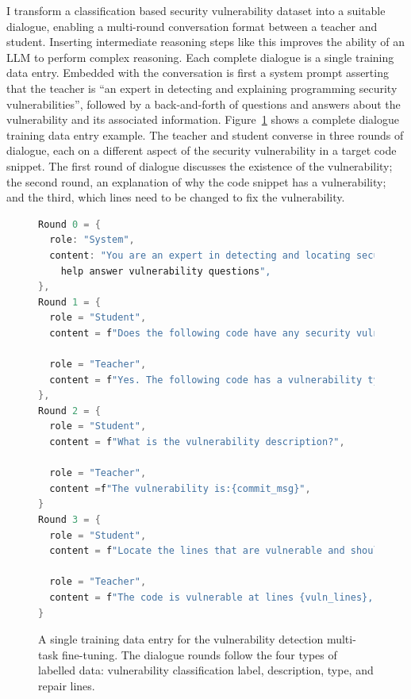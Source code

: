 \documentclass[12pt,openany,oneside,table]{cmuthesis}
\begin{document}
I transform a classification based security vulnerability dataset into a suitable dialogue, enabling a multi-round conversation format between a teacher and student. 
Inserting intermediate reasoning steps like this improves the ability of an LLM to perform complex reasoning. Each complete dialogue is a single training data entry. Embedded with the conversation is first a system prompt asserting that the teacher is ``an expert in detecting and explaining programming security vulnerabilities'', followed by a back-and-forth of questions and answers about the vulnerability and its associated information.
Figure~\ref{code:dialogue} shows a complete dialogue training data entry example. The teacher and student converse in three rounds of dialogue, each on a different aspect of the security vulnerability in a target code snippet. The first round of dialogue discusses the existence of the vulnerability; the second round, an explanation of why the code snippet has a vulnerability; and the third, which lines need to be changed to fix the vulnerability.


\begin{figure}[t!]
\centering
\begin{lstlisting}[numbersep=5pt,xleftmargin=21pt,numberstyle=\scriptsize,basicstyle=\footnotesize\ttfamily,firstnumber=1, language=C, language=C]
Round 0 = {
  role: "System",
  content: "You are an expert in detecting and locating security vulnerabilities, and can 
    help answer vulnerability questions", 
},
Round 1 = {
  role = "Student",
  content = f"Does the following code have any security vulnerabilities: {code_snippet}",

  role = "Teacher",
  content = f"Yes. The following code has a vulnerability type {cwe_type}.",
},
Round 2 = {
  role = "Student",
  content = f"What is the vulnerability description?",

  role = "Teacher",
  content =f"The vulnerability is:{commit_msg}",
}    
Round 3 = {
  role = "Student",
  content = f"Locate the lines that are vulnerable and should be repaired.",

  role = "Teacher",
  content = f"The code is vulnerable at lines {vuln_lines}, with the following fix: {fixing_code}",
}
\end{lstlisting}
\vspace*{-2mm}
\caption{\small A single training data entry for  the vulnerability detection multi-task fine-tuning. The dialogue rounds follow the four types of labelled data: vulnerability classification label,  description, type, and repair lines. 
}
\label{code:dialogue}
\end{figure}
\end{document}

